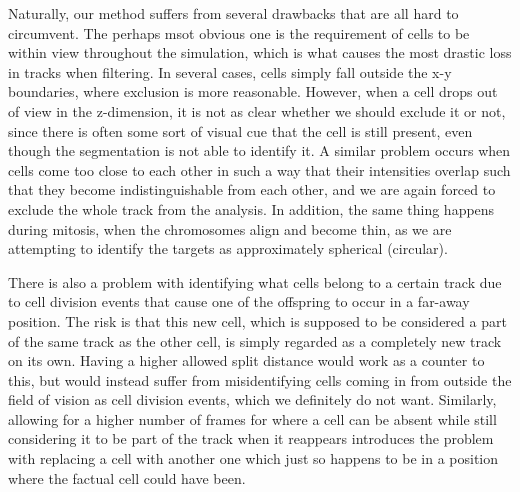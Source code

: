 \documentclass[10pt]{article}
\theoremstyle{plain}
\begin{document}
\begin{multicols*}{2}
\begin{multicols}{2}
Naturally, our method suffers from several drawbacks that are all hard to circumvent. The perhaps msot obvious one is the requirement of cells to be within view throughout the simulation, which is what causes the most drastic loss in tracks when filtering. In several cases, cells simply fall outside the x-y boundaries, where exclusion is more reasonable. However, when a cell drops out of view in the z-dimension, it is not as clear whether we should exclude it or not, since there is often some sort of visual cue that the cell is still present, even though the segmentation is not able to identify it. A similar problem occurs when cells come too close to each other in such a way that their intensities overlap such that they become indistinguishable from each other, and we are again forced to exclude the whole track from the analysis. In addition, the same thing happens during mitosis, when the chromosomes align and become thin, as we are attempting to identify the targets as approximately spherical (circular).

There is also a problem with identifying what cells belong to a certain track due to cell division events that cause one of the offspring to occur in a far-away position. The risk is that this new cell, which is supposed to be considered a part of the same track as the other cell, is simply regarded as a completely new track on its own. Having a higher allowed split distance would work as a counter to this, but would instead suffer from misidentifying cells coming in from outside the field of vision as cell division events, which we definitely do not want. Similarly, allowing for a higher number of frames for where a cell can be absent while still considering it to be part of the track when it reappears introduces the problem with replacing a cell with another one which just so happens to be in a position where the factual cell could have been.


\end{multicols}
\end{multicols*}
\end{document}
